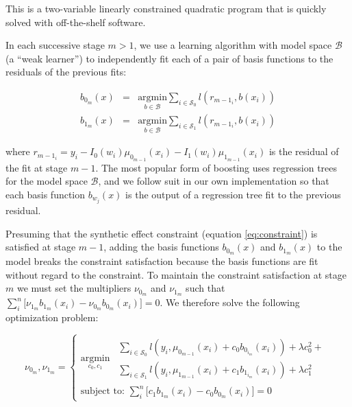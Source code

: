 This is a two-variable linearly constrained quadratic program that is quickly solved with off-the-shelf software.

In each successive stage $m>1$, we use a learning algorithm with model space $\mathcal{B}$ (a ``weak learner'') to independently fit each of a pair of basis functions to the residuals of the previous fits: 

\begin{equation}
\begin{array}{rcl}
b_{0_m}(x) & = & \underset{b \in \mathcal{B}}{\text{argmin}} \sum_{i \in \mathcal{S}_0} l \left(r_{m-1_i} , b(x_i) \right) \\
b_{1_m}(x) & = & \underset{b \in \mathcal{B}}{\text{argmin}} \sum_{i \in \mathcal{S}_1} l \left(r_{m-1_i} , b(x_i) \right) 
\end{array}
\end{equation}

where $r_{m-1_i} =y_i - I_0(w_i)\mu_{0_{m-1}}(x_i) - I_1(w_i)\mu_{1_{m-1}}(x_i)$ is the residual of the fit at stage $m-1$. The most popular form of boosting uses regression trees for the model space $\mathcal{B}$, and we follow suit in our own implementation so that each basis function $b_{w_j}(x)$ is the output of a regression tree fit to the previous residual.


Presuming that the synthetic effect constraint (equation \ref{eq:constraint}) is satisfied at stage $m-1$, adding the basis functions $b_{0_m}(x)$ and $b_{1_m}(x)$ to the model breaks the constraint satisfaction because the basis functions are fit without regard to the constraint. To maintain the constraint satisfaction at stage $m$ we must set the multipliers $\nu_{0_m}$ and $\nu_{1_m}$ such that $\sum_i^n \big[ \nu_{1_m}b_{1_m}(x_i) - \nu_{0_m}b_{0_m}(x_i) \big] = 0$. We therefore solve the following optimization problem:

\begin{equation}
\nu_{0_m}, \nu_{1_m} =
\begin{cases}
\underset{c_0, c_1}{\text{argmin}} \ \ 
\begin{array}{l} 
\sum_{i \in \mathcal{S}_0} l \left( y_i, \mu_{0_{m-1}}(x_i) + c_{0}b_{0_{i_m}}(x_i) \right) + 
\lambda c_0^2 + \\
\sum_{i \in \mathcal{S}_1} l \left( y_i, \mu_{1_{m-1}}(x_i) + c_{1}b_{1_{i_m}}(x_i) \right) + 
\lambda c_1^2
\end{array} \\
\text{subject to:   } \sum_i^n \big[ c_1 b_{1_m}(x_i) - c_0 b_{0_m}(x_i) \big] = 0
\end{cases}
\label{eq:stage-opt}
\end{equation}

